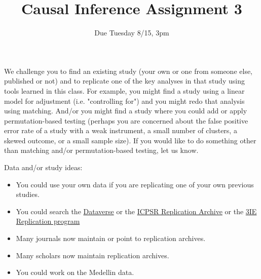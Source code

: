 \documentclass{article}
\title{Causal Inference Assignment 3}
\author{Due Tuesday 8/15, 3pm}
\begin{document}
\maketitle

We challenge you to find an existing study (your own or one from someone else, published or not) and to replicate one of the key analyses in that study using tools learned in this class. For example, you might find a study using a linear model for adjustment (i.e. "controlling for") and you might redo that analysis using matching. And/or you might find a study where you could add or apply permutation-based testing (perhaps you are concerned about the false positive error rate of a study with a weak instrument, a small number of clusters, a skewed outcome, or a small sample size). If you would like to do something other than matching and/or permutation-based testing, let us know.

Data and/or study ideas:
\begin{itemize}
 \item You could use your own data if you are replicating one of your own previous studies.
 \item You could search the \href{http://dataverse.org/}{Dataverse} or the \href{http://www.icpsr.umich.edu/icpsrweb/deposit/pra/index.jsp}{ICPSR Replication Archive} or the \href{http://www.3ieimpact.org/evaluation/impact-evaluation-replication-programme/}{3IE Replication program}
 \item Many journals now maintain or point to replication archives.
 \item Many scholars now maintain replication archives.
 \item You could work on the Medellin data.
\end{itemize}
\end{document}

